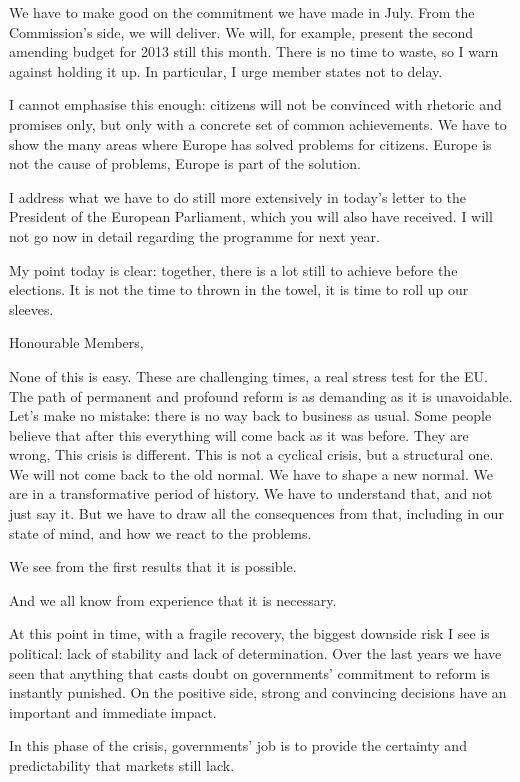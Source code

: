 \documentclass[a4paper,11pt]{article}
\begin{document}
We have to make good on the commitment we have made in July. From the Commission's side, we will deliver. We will, for example, present the second amending budget for 2013 still this month. There is no time to waste, so I warn against holding it up. In particular, I urge member states not to delay.

I cannot emphasise this enough: citizens will not be convinced with rhetoric and promises only, but only with a concrete set of common achievements. We have to show the many areas where Europe has solved problems for citizens. Europe is not the cause of problems, Europe is part of the solution.

I address what we have to do still more extensively in today's letter to the President of the European Parliament, which you will also have received. I will not go now in detail regarding the programme for next year.

My point today is clear: together, there is a lot still to achieve before the elections. It is not the time to thrown in the towel, it is time to roll up our sleeves.

Honourable Members,

None of this is easy. These are challenging times, a real stress test for the EU. The path of permanent and profound reform is as demanding as it is unavoidable. Let's make no mistake: there is no way back to business as usual. Some people believe that after this everything will come back as it was before. They are wrong, This crisis is different. This is not a cyclical crisis, but a structural one. We will not come back to the old normal. We have to shape a new normal. We are in a transformative period of history. We have to understand that, and not just say it. But we have to draw all the consequences from that, including in our state of mind, and how we react to the problems.

We see from the first results that it is possible.

And we all know from experience that it is necessary.

At this point in time, with a fragile recovery, the biggest downside risk I see is political: lack of stability and lack of determination. Over the last years we have seen that anything that casts doubt on governments' commitment to reform is instantly punished. On the positive side, strong and convincing decisions have an important and immediate impact.

In this phase of the crisis, governments' job is to provide the certainty and predictability that markets still lack.
\end{document}
